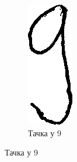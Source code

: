 \begin{figure}[htb!]
\begin{subfigure}{.3\textwidth}
\includegraphics[width=.4\linewidth]{pictures/1/GoodClass9}
\caption{Тачка у 9}\label{pic:goodClass9}
\end{subfigure}
\end{figure}



